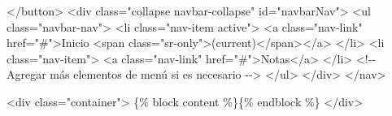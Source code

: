 \documentclass[
  a4paper,
  DIV=11,
  numbers=noendperiod,
  onepage,
  openany]{scrreprt}
\newenvironment{Shaded}{\begin{snugshade}}{\end{snugshade}}
\newcommand{\CommentTok}[1]{\textcolor[rgb]{0.37,0.37,0.37}{#1}}
\newcommand{\DataTypeTok}[1]{\textcolor[rgb]{0.68,0.00,0.00}{#1}}
\newcommand{\KeywordTok}[1]{\textcolor[rgb]{0.00,0.23,0.31}{#1}}
\newcommand{\NormalTok}[1]{\textcolor[rgb]{0.00,0.23,0.31}{#1}}
\newcommand{\OperatorTok}[1]{\textcolor[rgb]{0.37,0.37,0.37}{#1}}
\newcommand{\OtherTok}[1]{\textcolor[rgb]{0.00,0.23,0.31}{#1}}
\newcommand{\StringTok}[1]{\textcolor[rgb]{0.13,0.47,0.30}{#1}}
\begin{document}
\begin{Shaded}
\begin{Highlighting}[]
        \DataTypeTok{\textless{}/}\KeywordTok{button}\DataTypeTok{\textgreater{}}
        \DataTypeTok{\textless{}}\KeywordTok{div}\OtherTok{ class}\OperatorTok{=}\StringTok{"collapse navbar{-}collapse"}\OtherTok{ id}\OperatorTok{=}\StringTok{"navbarNav"}\DataTypeTok{\textgreater{}}
            \DataTypeTok{\textless{}}\KeywordTok{ul}\OtherTok{ class}\OperatorTok{=}\StringTok{"navbar{-}nav"}\DataTypeTok{\textgreater{}}
                \DataTypeTok{\textless{}}\KeywordTok{li}\OtherTok{ class}\OperatorTok{=}\StringTok{"nav{-}item active"}\DataTypeTok{\textgreater{}}
                    \DataTypeTok{\textless{}}\KeywordTok{a}\OtherTok{ class}\OperatorTok{=}\StringTok{"nav{-}link"}\OtherTok{ href}\OperatorTok{=}\StringTok{"\#"}\DataTypeTok{\textgreater{}}\NormalTok{Inicio }\DataTypeTok{\textless{}}\KeywordTok{span}\OtherTok{ class}\OperatorTok{=}\StringTok{"sr{-}only"}\DataTypeTok{\textgreater{}}\NormalTok{(current)}\DataTypeTok{\textless{}/}\KeywordTok{span}\DataTypeTok{\textgreater{}\textless{}/}\KeywordTok{a}\DataTypeTok{\textgreater{}}
                \DataTypeTok{\textless{}/}\KeywordTok{li}\DataTypeTok{\textgreater{}}
                \DataTypeTok{\textless{}}\KeywordTok{li}\OtherTok{ class}\OperatorTok{=}\StringTok{"nav{-}item"}\DataTypeTok{\textgreater{}}
                    \DataTypeTok{\textless{}}\KeywordTok{a}\OtherTok{ class}\OperatorTok{=}\StringTok{"nav{-}link"}\OtherTok{ href}\OperatorTok{=}\StringTok{"\#"}\DataTypeTok{\textgreater{}}\NormalTok{Notas}\DataTypeTok{\textless{}/}\KeywordTok{a}\DataTypeTok{\textgreater{}}
                \DataTypeTok{\textless{}/}\KeywordTok{li}\DataTypeTok{\textgreater{}}
                \CommentTok{\textless{}!{-}{-} Agregar más elementos de menú si es necesario {-}{-}\textgreater{}}
            \DataTypeTok{\textless{}/}\KeywordTok{ul}\DataTypeTok{\textgreater{}}
        \DataTypeTok{\textless{}/}\KeywordTok{div}\DataTypeTok{\textgreater{}}
    \DataTypeTok{\textless{}/}\KeywordTok{nav}\DataTypeTok{\textgreater{}}

    \DataTypeTok{\textless{}}\KeywordTok{div}\OtherTok{ class}\OperatorTok{=}\StringTok{"container"}\DataTypeTok{\textgreater{}}
\NormalTok{        \{\% block content \%\}\{\% endblock \%\}}
    \DataTypeTok{\textless{}/}\KeywordTok{div}\DataTypeTok{\textgreater{}}


\end{Highlighting}
\end{Shaded}
\end{document}
